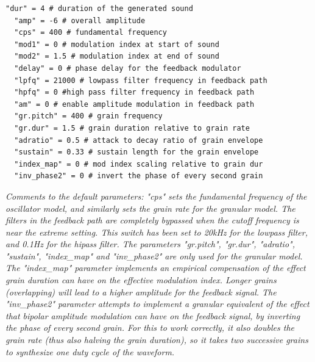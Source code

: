 \documentclass[runningheads,a4paper]{llncs}
\begin{document}
\noindent\begin{minipage}{\linewidth}
\begin{lstlisting}[caption=Default parameters for the synthesis models, label=lst:defaultparameters]
  "dur" = 4 # duration of the generated sound
  "amp" = -6 # overall amplitude
  "cps" = 400 # fundamental frequency 
  "mod1" = 0 # modulation index at start of sound
  "mod2" = 1.5 # modulation index at end of sound
  "delay" = 0 # phase delay for the feedback modulator
  "lpfq" = 21000 # lowpass filter frequency in feedback path
  "hpfq" = 0 #high pass filter frequency in feedback path
  "am" = 0 # enable amplitude modulation in feedback path
  "gr.pitch" = 400 # grain frequency 
  "gr.dur" = 1.5 # grain duration relative to grain rate
  "adratio" = 0.5 # attack to decay ratio of grain envelope
  "sustain" = 0.33 # sustain length for the grain envelope
  "index_map" = 0 # mod index scaling relative to grain dur
  "inv_phase2" = 0 # invert the phase of every second grain
\end{lstlisting}
\emph{Comments to the default parameters: "cps" sets the fundamental frequency of the oscillator model, and similarly sets the grain rate for the granular model. The filters in the feedback path are completely bypassed when the cutoff frequency is near the extreme setting. This switch has been set to 20kHz for the lowpass filter, and 0.1Hz for the hipass filter. The parameters "gr.pitch", "gr.dur", "adratio", "sustain", "index\_map" and "inv\_phase2" are only used for the granular model. The "index\_map" parameter implements an empirical compensation of the effect grain duration can have on the effective modulation index. Longer grains (overlapping) will lead to a higher amplitude for the feedback signal. The "inv\_phase2" parameter attempts to implement a granular equivalent of the effect that bipolar amplitude modulation can have on the feedback signal, by inverting the phase of every second grain. For this to work correctly, it also doubles the grain rate (thus also halving the grain duration), so it takes two successive grains to synthesize one duty cycle of the waveform.}
	
\end{minipage}
\end{document}

